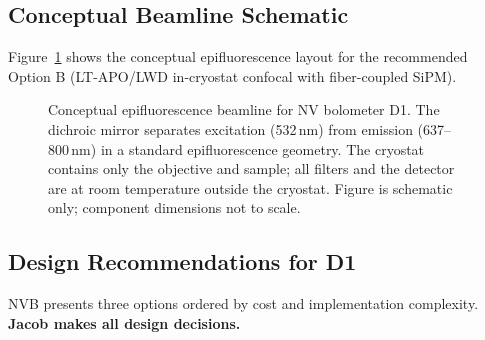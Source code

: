 
\subsection{Conceptual Beamline Schematic}
\label{sec:oq4_schematic}

Figure~\ref{fig:oq4_beamline} shows the conceptual epifluorescence layout
for the recommended Option B (LT-APO/LWD in-cryostat confocal with
fiber-coupled SiPM).

\begin{figure}[h!]
\centering
{}
\caption{Conceptual epifluorescence beamline for NV bolometer D1.
The dichroic mirror separates excitation (532\,nm) from emission
(637--800\,nm) in a standard epifluorescence geometry. The cryostat
contains only the objective and sample; all filters and the detector
are at room temperature outside the cryostat. Figure is schematic
only; component dimensions not to scale.}
\label{fig:oq4_beamline}
\end{figure}

\subsection{Design Recommendations for D1}
\label{sec:oq4_recommendations}

NVB presents three options ordered by cost and implementation complexity.
\textbf{Jacob makes all design decisions.}

